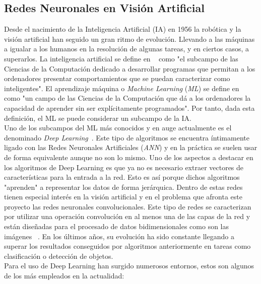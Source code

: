 \documentclass{bmvc2k}
\begin{document}
\subsection{Redes Neuronales en Visión Artificial}
Desde el nacimiento de la Inteligencia Artificial (IA) en 1956 la robótica y la visión artificial han seguido un gran ritmo de evolución. Llevando a las máquinas a igualar a los humanos en la resolución de algunas tareas, y en ciertos casos, a superarlos.
La inteligencia artificial se define en ~\cite{mccarthy2006proposal} como "el subcampo de las Ciencias de la Computación dedicado a desarrollar programas que permitan a los ordenadores presentar comportamientos que se puedan caracterizar como inteligentes". El aprendizaje máquina o \textit{Machine Learning} (\textit{ML}) se define en ~\cite{samuel2000some} como "un campo de las Ciencias de la Computación que dá a los ordenadores la capacidad de aprender sin ser explícitamente programados". Por tanto, dada esta definición, el ML se puede considerar un subcampo de la IA.\\
Uno de los subcampos del ML más conocidos y en auge actualmente es el denominado \textit{Deep Learning}~\cite{deng2014deep}. Este tipo de algoritmos se encuentra íntimamente ligado con las Redes Neuronales Artificiales (\textit{ANN}) y en la práctica se suelen usar de forma equivalente aunque no son lo mismo. Uno de los aspectos a destacar en los algoritmos de Deep Learning es que ya no es necesario extraer vectores de características para la entrada a la red. Esto es así porque dichos algoritmos "aprenden" a representar los datos de forma jerárquica. Dentro de estas redes tienen especial interés en la visión artificial y en el problema que afronta este proyecto las redes neuronales convolucionales. Este tipo de redes se caracterizan por utilizar una operación convolución en al menos una de las capas de la red y están diseñadas para el procesado de datos bidimensionales como son las imágenes ~\cite{liu2015implementation}. En los últimos años, su evolución ha sido constante llegando a superar los resultados conseguidos por algoritmos anteriormente en tareas como clasificación o detección de objetos.\\
Para el uso de Deep Learning han surgido numerosos entornos, estos son algunos de los más empleados en la actualidad:
\end{document}

